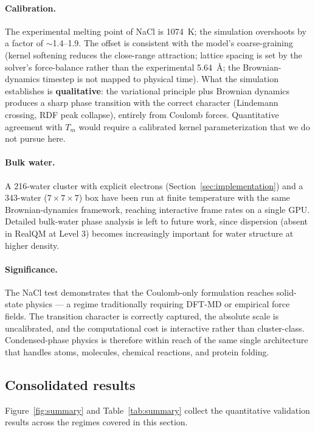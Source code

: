 \documentclass[11pt]{article}
\begin{document}
\paragraph{Calibration.}
The experimental melting point of NaCl is 1074~K; the simulation overshoots by a factor of $\sim$1.4--1.9. The offset is consistent with the model's coarse-graining (kernel softening reduces the close-range attraction; lattice spacing is set by the solver's force-balance rather than the experimental 5.64~\AA; the Brownian-dynamics timestep is not mapped to physical time). What the simulation establishes is \textbf{qualitative}: the variational principle plus Brownian dynamics produces a sharp phase transition with the correct character (Lindemann crossing, RDF peak collapse), entirely from Coulomb forces. Quantitative agreement with $T_m$ would require a calibrated kernel parameterization that we do not pursue here.

\paragraph{Bulk water.}
A 216-water cluster with explicit electrons (Section~\ref{sec:implementation}) and a 343-water ($7 \times 7 \times 7$) box have been run at finite temperature with the same Brownian-dynamics framework, reaching interactive frame rates on a single GPU. Detailed bulk-water phase analysis is left to future work, since dispersion (absent in RealQM at Level 3) becomes increasingly important for water structure at higher density.

\paragraph{Significance.}
The NaCl test demonstrates that the Coulomb-only formulation reaches solid-state physics --- a regime traditionally requiring DFT-MD or empirical force fields. The transition character is correctly captured, the absolute scale is uncalibrated, and the computational cost is interactive rather than cluster-class. Condensed-phase physics is therefore within reach of the same single architecture that handles atoms, molecules, chemical reactions, and protein folding.

\subsection{Consolidated results}\label{sec:summary}

Figure~\ref{fig:summary} and Table~\ref{tab:summary} collect the quantitative validation results across the regimes covered in this section.
\end{document}
